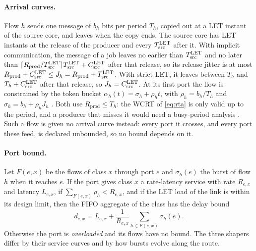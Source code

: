 \paragraph{Arrival curves.} Flow $h$ sends one message of $b_h$ bits per
period $T_h$, copied out at a LET instant of the source core, and leaves
when the copy ends. The source core has LET instants at the release of
the producer and every $T^{\mathrm{LET}}_{\mathrm{src}}$ after it. With implicit
communication, the message of a job leaves no earlier than
$T^{\mathrm{LET}}_{\mathrm{src}}$ and no later than
$\lceil R_{\mathrm{prod}}/T^{\mathrm{LET}}_{\mathrm{src}}\rceil
T^{\mathrm{LET}}_{\mathrm{src}}+C^{\mathrm{LET}}_{\mathrm{src}}$ after that release, so its
release jitter is at most $R_{\mathrm{prod}}+C^{\mathrm{LET}}_{\mathrm{src}}\le
J_h=R_{\mathrm{prod}}+T^{\mathrm{LET}}_{\mathrm{src}}$. With strict LET, it leaves
between $T_h$ and $T_h+C^{\mathrm{LET}}_{\mathrm{src}}$ after that release, so
$J_h=C^{\mathrm{LET}}_{\mathrm{src}}$. At its first port the flow is constrained by
the token bucket $\alpha_h(t)=\sigma_h+\rho_h t$, with $\rho_h=b_h/T_h$
and $\sigma_h=b_h+\rho_hJ_h$ \cite{leboudec2001network}. Both use
$R_{\mathrm{prod}}\le T_h$: the WCRT of \cref{eq:rta} is only valid up to
the period, and a producer that misses it would need a busy-period
analysis \cite{lehoczky1990fixed}. Such a flow is given no arrival curve
instead: every port it crosses, and every port these feed, is declared
unbounded, so no bound depends on it.

\paragraph{Port bound.} Let $F(e,x)$ be the flows of class $x$ through
port $e$ and $\sigma_h(e)$ the burst of flow $h$ when it reaches $e$. If
the port gives class $x$ a rate-latency service with rate $R_{e,x}$ and
latency $L_{e,x}$, if $\sum_{F(e,x)}\rho_h<R_{e,x}$, and if the LET load
of the link is within its design limit, then the FIFO aggregate of the
class has the delay bound \cite{leboudec2001network}
\begin{equation}
d_{e,x}=L_{e,x}+\frac{1}{R_{e,x}}\sum_{h\in F(e,x)}\sigma_h(e).
\label{eq:port-delay}
\end{equation}
Otherwise the port is \emph{overloaded} and its flows have no bound. The
three shapers differ by their service curves and by how bursts evolve
along the route.

